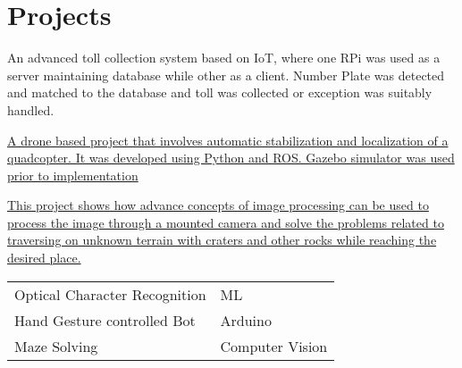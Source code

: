\documentclass[]{deedy-resume-openfont}
\begin{document}
\begin{minipage}[t]{0.66\textwidth}

\section{Projects}
An advanced toll collection system based on IoT, where one RPi was used as a server maintaining database while other as a client. Number Plate was detected and matched to the database and toll was collected or exception was suitably handled.
\sectionsep

\href{https://github.com/sakshamkatiyar/chaser_drone}{
A drone based project that involves automatic stabilization and localization of a quadcopter. It was developed using Python and ROS. Gazebo simulator was used prior to implementation
\sectionsep}

\href{https://github.com/sakshamkatiyar/cross_a_crater}{
This project shows how advance concepts of image processing can be used to process the image through a mounted camera and solve the problems related to traversing on unknown terrain with craters and other rocks while reaching the desired place.
\sectionsep}

\begin{tabular}{ll}
    \textbullet{} Optical Character Recognition & ML \\
    \textbullet{} Hand Gesture controlled Bot & Arduino \\
    \textbullet{} Maze Solving & Computer Vision
\end{tabular}

\sectionsep



\end{minipage}
\end{document}
